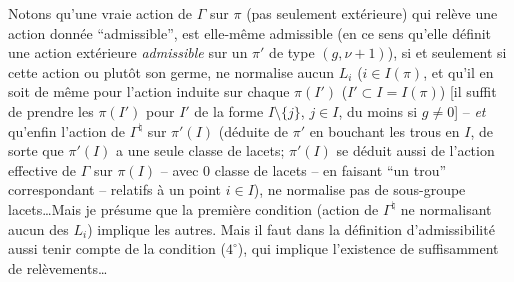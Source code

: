 Notons qu'une vraie action de $\Gamma$ sur $\pi$ (pas seulement
extérieure) qui relève une action donnée
``admissible'', est elle-même admissible (en ce sens qu'elle
définit une action extérieure {\it admissible} sur un
$\pi'$ de type $(g,\nu+1)$), si et seulement si cette
action ou plutôt son germe, ne normalise aucun $L_i$
($i\in I(\pi)$, et qu'il en soit de même pour l'action
induite sur chaque $\pi(I')$ ($I'\subset  I=I(\pi)$) [il suffit
de prendre les $\pi(I')$ pour $I'$ de la forme $I\setminus
\{j\}$, $j\in I$, du moins si $g\ne 0$] -- {\it et}
qu'enfin l'action de $\Gamma^\natural$ sur $\pi'(I)$ (déduite
de $\pi'$ en bouchant les trous en $I$, de sorte que
$\pi'(I)$ a une seule classe de lacets; $\pi'(I)$ se
déduit aussi de l'action effective de $\Gamma$ sur $\pi(I)$ --
avec 0 classe de lacets -- en faisant ``un trou''
correspondant -- relatifs à un point $i\in I$), ne normalise
pas de sous-groupe lacets\dots  Mais je présume que la première
condition (action de $\Gamma^\natural$ ne normalisant aucun des $L_i$)
implique les autres.  Mais il faut dans la définition
d'admissibilité aussi tenir compte de la condition
($4^\circ$), qui implique l'existence de suffisamment de
relèvements\dots

